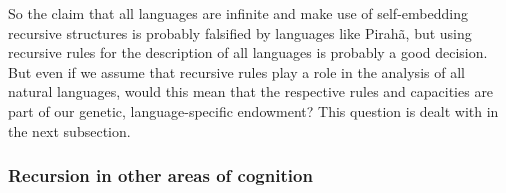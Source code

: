 So the claim that all languages are infinite and make use of self-embedding recursive structures is
probably falsified by languages like Pirahã, but using recursive rules for the description of all
languages is probably a good decision. But even if we assume that recursive rules play a role in the
analysis of all natural languages, would this mean that the respective rules and capacities are part
of our genetic, language-specific endowment? This question is dealt with in the next subsection.



\subsubsection{Recursion in other areas of cognition}

